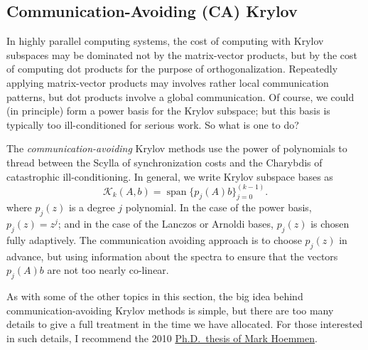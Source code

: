 \subsection{Communication-Avoiding (CA) Krylov}

In highly parallel computing systems, the cost of computing with Krylov
subspaces may be dominated not by the matrix-vector products, but by the
cost of computing dot products for the purpose of orthogonalization.
Repeatedly applying matrix-vector products may involves rather local
communication patterns, but dot products involve a global communication.
Of course, we could (in principle) form a power basis for the Krylov
subspace; but this basis is typically too ill-conditioned for serious
work.  So what is one to do?

The {\em communication-avoiding} Krylov methods use the power of
polynomials to thread between the Scylla of synchronization costs and
the Charybdis of catastrophic ill-conditioning.  In general, we write
Krylov subspace bases as
\[
  \mathcal{K}_k(A,b) = \operatorname{span}\{ p_j(A) b \}_{j=0}^{(k-1)}.
\]
where $p_j(z)$ is a degree $j$ polynomial.  In the case of the
power basis, $p_j(z) = z^j$; and in the case of the Lanczos or
Arnoldi bases, $p_j(z)$ is chosen fully adaptively.  The communication
avoiding approach is to choose $p_j(z)$ in advance, but using information
about the spectra to ensure that the vectors $p_j(A) b$ are not too
nearly co-linear.

As with some of the other topics in this section, the big idea behind
communication-avoiding Krylov methods is simple, but there are too many
details to give a full treatment in the time we have allocated.  For
those interested in such details, I recommend the 2010 \href{https://www2.eecs.berkeley.edu/Pubs/TechRpts/2010/EECS-2010-37.pdf}{Ph.D.~thesis of
Mark Hoemmen}.
